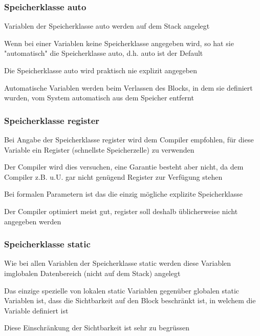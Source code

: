 				\subsubsection{Speicherklasse auto}
					\begin{compactitem}
						\item Variablen der Speicherklasse auto werden auf dem Stack angelegt
						\item Wenn bei einer Variablen keine Speicherklasse angegeben wird, so hat sie
						"automatisch" die Speicherklasse auto, d.h. auto ist der Default
						\item Die Speicherklasse auto wird praktisch nie explizit angegeben 
						\item Automatische Variablen werden beim Verlassen des Blocks, in dem sie
						definiert wurden, vom System automatisch aus dem Speicher entfernt
					\end{compactitem}
				\subsubsection{Speicherklasse register}
					\begin{compactitem}
						\item Bei Angabe der Speicherklasse register wird dem Compiler empfohlen, für
						diese Variable ein Register (schnellste Speicherzelle) zu verwenden
						\item Der Compiler wird dies versuchen, eine Garantie besteht aber nicht, da dem
						Compiler z.B. u.U. gar nicht genügend Register zur Verfügung stehen
						\item Bei formalen Parametern ist das die einzig mögliche explizite Speicherklasse
						\item Der Compiler optimiert meist gut, register soll deshalb üblicherweise nicht
						angegeben werden
					\end{compactitem}				
				\subsubsection{Speicherklasse static}
					\begin{compactitem}
						\item Wie bei allen Variablen der Speicherklasse static werden diese Variablen imglobalen Datenbereich (nicht auf dem Stack) angelegt
						\item Das einzige spezielle von lokalen static Variablen gegenüber globalen 
						static Variablen ist, dass die Sichtbarkeit auf den Block beschränkt ist, in
						welchem die Variable definiert ist
						\item Diese Einschränkung der Sichtbarkeit ist sehr zu begrüssen
					\end{compactitem}	
\newpage
